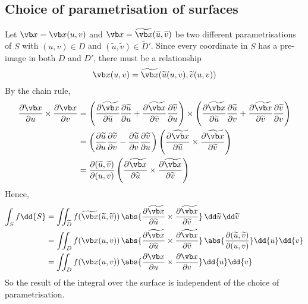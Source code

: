 \subsection{Choice of parametrisation of surfaces}
Let \(\vb x = \vb x(u, v)\) and \(\vb x = \widetilde {\vb x} (\widetilde u, \widetilde v)\) be two different parametrisations of \(S\) with \((u, v) \in D\) and \((\widetilde u, \widetilde v) \in \widetilde D'\).
Since every coordinate in \(S\) has a pre-image in both \(D\) and \(D'\), there must be a relationship
\[
	\vb x(u, v) = \widetilde {\vb x} (\widetilde u(u, v), \widetilde v(u, v))
\]
By the chain rule,
\begin{align*}
	\frac{\partial \vb x}{\partial u} \times \frac{\partial \vb x}{\partial v} & = \left( \frac{\partial \widetilde {\vb x}}{\partial \widetilde u}\frac{\partial \widetilde u}{\partial u} + \frac{\partial \widetilde {\vb x}}{\partial \widetilde v}\frac{\partial \widetilde v}{\partial u} \right) \times \left( \frac{\partial \widetilde {\vb x}}{\partial \widetilde u}\frac{\partial \widetilde u}{\partial v} + \frac{\partial \widetilde {\vb x}}{\partial \widetilde v}\frac{\partial \widetilde v}{\partial v} \right) \\
	                                                                           & = \left( \frac{\partial \widetilde u}{\partial u}\frac{\partial \widetilde v}{\partial v} - \frac{\partial \widetilde u}{\partial v}\frac{\partial \widetilde v}{\partial u} \right) \left( \frac{\partial \widetilde {\vb x}}{\partial \widetilde u}\times\frac{\partial \widetilde {\vb x}}{\partial \widetilde v} \right)                                                                                                                       \\
	                                                                           & = \frac{\partial (\widetilde u, \widetilde v)}{\partial (u, v)} \left( \frac{\partial \widetilde {\vb x}}{\partial \widetilde u}\times\frac{\partial \widetilde {\vb x}}{\partial \widetilde v} \right)
\end{align*}
Hence,
\begin{align*}
	\int_S f \dd{S} & = \iint_{\widetilde D} f(\widetilde {\vb x}(\widetilde u, \widetilde v)) \,\abs{\frac{\partial \widetilde {\vb x}}{\partial \widetilde u}\times\frac{\partial \widetilde {\vb x}}{\partial \widetilde v}}\,\dd \widetilde u\,\dd \widetilde v \\
	                & = \iint_D f(\vb x(u, v)) \,\abs{\frac{\partial \widetilde {\vb x}}{\partial \widetilde u}\times\frac{\partial \widetilde {\vb x}}{\partial \widetilde v}}\,\abs{\frac{\partial (\widetilde u, \widetilde v)}{\partial (u, v)}}\dd{u}\dd{v}    \\
	                & = \iint_D f(\vb x(u, v)) \,\abs{\frac{\partial \vb x}{\partial u}\times\frac{\partial \vb x}{\partial v}}\dd{u}\dd{v}                                                                                                                         \\
\end{align*}
So the result of the integral over the surface is independent of the choice of parametrisation.
